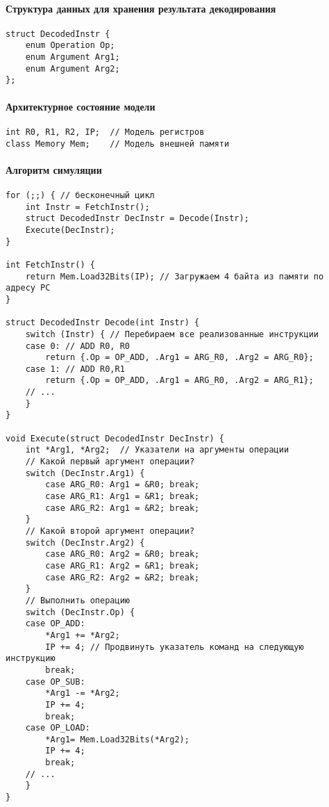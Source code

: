 \paragraph{Структура данных для хранения результата декодирования} 
\begin{lstlisting}
struct DecodedInstr {
    enum Operation Op;
    enum Argument Arg1;
    enum Argument Arg2;
};
\end{lstlisting}

\paragraph{Архитектурное состояние модели}
\begin{lstlisting}
int R0, R1, R2, IP;  // Модель регистров
class Memory Mem;    // Модель внешней памяти
\end{lstlisting}

\paragraph{Алгоритм симуляции}
\begin{lstlisting}
for (;;) { // бесконечный цикл
    int Instr = FetchInstr();
    struct DecodedInstr DecInstr = Decode(Instr);
    Execute(DecInstr);
}

int FetchInstr() {
    return Mem.Load32Bits(IP); // Загружаем 4 байта из памяти по адресу PC
}

struct DecodedInstr Decode(int Instr) {
    switch (Instr) { // Перебираем все реализованные инструкции
    case 0: // ADD R0, R0
        return {.Op = OP_ADD, .Arg1 = ARG_R0, .Arg2 = ARG_R0};
    case 1: // ADD R0,R1
        return {.Op = OP_ADD, .Arg1 = ARG_R0, .Arg2 = ARG_R1};
    // ...
    }
}

void Execute(struct DecodedInstr DecInstr) {
    int *Arg1, *Arg2;  // Указатели на аргументы операции
    // Какой первый аргумент операции?
    switch (DecInstr.Arg1) {
        case ARG_R0: Arg1 = &R0; break;
        case ARG_R1: Arg1 = &R1; break;
        case ARG_R2: Arg1 = &R2; break;
    }
    // Какой второй аргумент операции?
    switch (DecInstr.Arg2) {
        case ARG_R0: Arg2 = &R0; break;
        case ARG_R1: Arg2 = &R1; break;
        case ARG_R2: Arg2 = &R2; break;
    }
    // Выполнить операцию
    switch (DecInstr.Op) {
    case OP_ADD:
        *Arg1 += *Arg2;
        IP += 4; // Продвинуть указатель команд на следующую инструкцию
        break;
    case OP_SUB:
        *Arg1 -= *Arg2;
        IP += 4; 
        break;
    case OP_LOAD:
        *Arg1= Mem.Load32Bits(*Arg2);
        IP += 4; 
        break;
    // ...
    }
}
\end{lstlisting}


